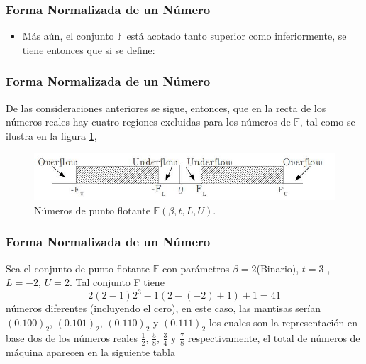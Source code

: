 \documentclass{beamer}
\begin{document}
\frame
{
\frametitle{Forma Normalizada de un N\'umero}
\begin{itemize}
 \item  M\'as a\'un, el conjunto $\mathbb{F}$ est\'a acotado tanto superior como inferiormente, se tiene entonces que si se define:
\end{itemize}
}
\begin{frame}
\frametitle{Forma Normalizada de un N\'umero}
De las consideraciones anteriores se sigue, entonces, que en la recta de los n\'umeros reales hay cuatro regiones
excluidas para los n\'umeros de $\mathbb{F}$, tal como se ilustra en la figura \ref{nums_flot},
\begin{figure}[ht]
  \begin{center}
    \includegraphics[scale=0.4]{./conj_F.jpg}
  \end{center}
  \caption{N\'umeros de punto flotante $\mathbb{F}(\beta, t, L, U )$.}
  \label{nums_flot}
  \end{figure}  
\end{frame}
\begin{frame}
\frametitle{Forma Normalizada de un N\'umero}
Sea el conjunto de punto flotante $\mathbb{F}$ con par\'ametros $\beta=2$(Binario), $t =3$ , $L = -2$, $U
=2$. Tal conjunto F tiene
$$
2(2-1)2^3-1(2-(-2)+1)+1=41
$$
n\'umeros diferentes (incluyendo el cero), en este caso, las mantisas ser\'ian $(0.100)_2$, $(0.101)_2$, $(0.110)_2$ y
$(0.111)_2$ los cuales son la representaci\'on en base dos de los n\'umeros reales $\frac{1}{2}$, $\frac{5}{8}$,
$\frac{3}{4}$ y $\frac{7}{8}$ respectivamente, el total de n\'umeros de m\'aquina aparecen en la siguiente tabla
\end{frame}
\end{document}
